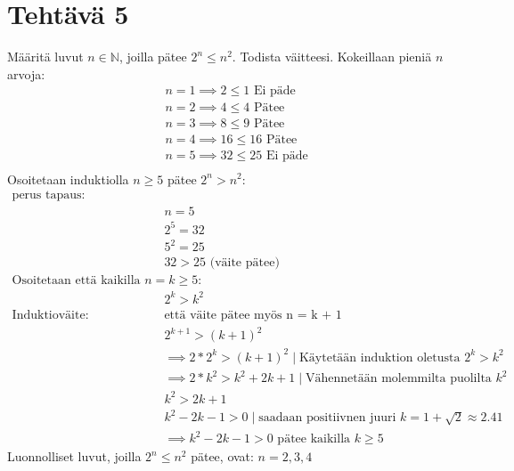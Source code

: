 \documentclass{article}
\begin{document}
	\section*{Tehtävä 5}
    Määritä luvut $n \in \mathbb{N}$, joilla pätee $2^n \leq n^2$. Todista väitteesi.
    \newline
    \newline
    Kokeillaan pieniä $n$ arvoja:
    \[
        \begin{aligned}
            &n = 1 \implies 2 \leq 1 \text{ Ei päde}\\
            &n = 2 \implies 4 \leq 4 \text{ Pätee}\\
            &n = 3 \implies 8 \leq 9 \text{ Pätee}\\
            &n = 4 \implies 16 \leq 16 \text{ Pätee}\\
            &n = 5 \implies 32 \leq 25 \text{ Ei päde}\\
        \end{aligned}
    \]
    Osoitetaan induktiolla $n \geq 5$ pätee $2^n > n^2  $:
    \[
        \begin{aligned}
            \text{perus tapaus:}&\\
            &n = 5\\
            &2^5 = 32\\
            &5^2 = 25\\
            &32 > 25 \text{ (väite pätee)}\\[10pt]
            \text{Osoitetaan että kaikilla $n = k \geq 5$:}&\\
            &2^k > k^2\\
            \text{Induktioväite: Todistetaan, } & \text{että väite pätee myös n = k + 1}\\
            &2^{k+1} > (k+1)^2\\
            &\implies 2 * 2^k > (k + 1)^2 \mid \text{Käytetään induktion oletusta } 2^k > k^2\\
            &\implies 2 * k^2 > k^2 + 2k + 1 \mid \text{Vähennetään molemmilta puolilta } k^2\\
            &k^2 > 2k + 1\\
            &k^2 - 2k - 1 > 0 \mid \text{saadaan positiivnen juuri } k = 1 + \sqrt{2} \approx 2.41\\
            &\implies k^2 - 2k - 1 > 0 \text{ pätee kaikilla }k \geq 5 
        \end{aligned}
    \]
    Luonnolliset luvut, joilla  $2^n \leq n^2$ pätee, ovat:
    \newline
    $n = 2, 3, 4$
\end{document}
